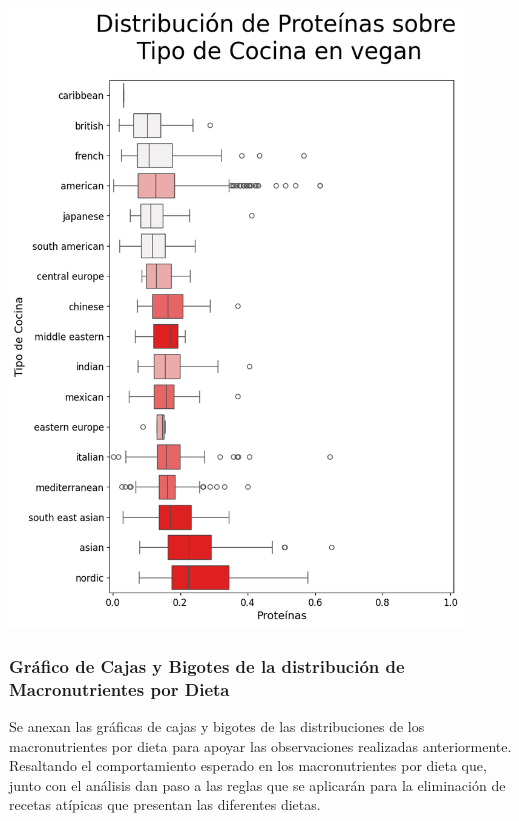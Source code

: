 \documentclass[12pt,a4paper]{article}
\begin{document}
            \begin{center}
                \includegraphics[width=0.90\textwidth]{Resources/2_03_plot_05_2.png}
            \end{center}

        \subsubsection{Gráfico de Cajas y Bigotes de la distribución de Macronutrientes por Dieta}
            Se anexan las gráficas de cajas y bigotes de las distribuciones de los 
            macronutrientes por dieta para apoyar las observaciones realizadas anteriormente. 
            Resaltando el comportamiento esperado en los macronutrientes por dieta que, junto 
            con el análisis dan paso a las reglas que se aplicarán para la eliminación de recetas 
            atípicas que presentan las diferentes dietas.
\end{document}
